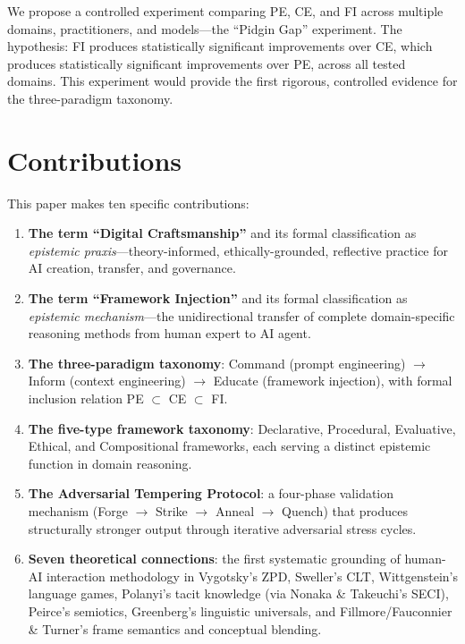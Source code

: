 \documentclass[12pt,a4paper]{article}
\begin{document}
We propose a controlled experiment comparing PE, CE, and FI across multiple domains, practitioners, and models---the ``Pidgin Gap'' experiment. The hypothesis: FI produces statistically significant improvements over CE, which produces statistically significant improvements over PE, across all tested domains. This experiment would provide the first rigorous, controlled evidence for the three-paradigm taxonomy.


\section{Contributions}
\label{sec:contributions}

This paper makes ten specific contributions:

\begin{enumerate}
  \item \textbf{The term ``Digital Craftsmanship''} and its formal classification as \emph{epistemic praxis}---theory-informed, ethically-grounded, reflective practice for AI creation, transfer, and governance.

  \item \textbf{The term ``Framework Injection''} and its formal classification as \emph{epistemic mechanism}---the unidirectional transfer of complete domain-specific reasoning methods from human expert to AI agent.

  \item \textbf{The three-paradigm taxonomy}: Command (prompt engineering) $\to$ Inform (context engineering) $\to$ Educate (framework injection), with formal inclusion relation PE $\subset$ CE $\subset$ FI.

  \item \textbf{The five-type framework taxonomy}: Declarative, Procedural, Evaluative, Ethical, and Compositional frameworks, each serving a distinct epistemic function in domain reasoning.

  \item \textbf{The Adversarial Tempering Protocol}: a four-phase validation mechanism (Forge $\to$ Strike $\to$ Anneal $\to$ Quench) that produces structurally stronger output through iterative adversarial stress cycles.

  \item \textbf{Seven theoretical connections}: the first systematic grounding of human-AI interaction methodology in Vygotsky's ZPD, Sweller's CLT, Wittgenstein's language games, Polanyi's tacit knowledge (via Nonaka \& Takeuchi's SECI), Peirce's semiotics, Greenberg's linguistic universals, and Fillmore/Fauconnier \& Turner's frame semantics and conceptual blending.


\end{enumerate}
\end{document}
